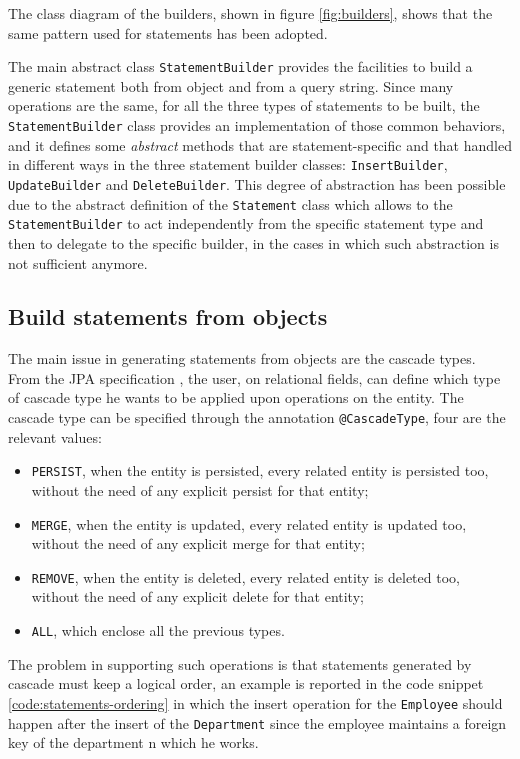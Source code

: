 \noindent The class diagram of the builders, shown in figure \ref{fig:builders}, shows that the same pattern used for statements has been adopted.

\noindent The main abstract class \texttt{StatementBuilder} provides the facilities to build a generic statement both from object and from a query string.
Since many operations are the same, for all the three types of statements to be built, the \texttt{StatementBuilder} class provides an implementation of those common behaviors, and it defines some \textit{abstract} methods that are statement-specific and that handled in different ways in the three statement builder classes: \texttt{InsertBuilder}, \texttt{UpdateBuilder} and \texttt{DeleteBuilder}.
This degree of abstraction has been possible due to the abstract definition of the \texttt{Statement} class which allows to the \texttt{StatementBuilder} to act independently from the specific statement type and then to delegate to the specific builder, in the cases in which such abstraction is not sufficient anymore.

\subsection{Build statements from objects}
The main issue in generating statements from objects are the cascade types. From the JPA specification \cite{book:projpa2}, the user, on relational fields, can define which type of cascade type he wants to be applied upon operations on the entity. The cascade type can be specified through the annotation \texttt{@CascadeType}, four are the relevant values:
\begin{itemize}
\item \texttt{PERSIST}, when the entity is persisted, every related entity is persisted too, without the need of any explicit persist for that entity;
\item \texttt{MERGE}, when the entity is updated, every related entity is updated too, without the need of any explicit merge for that entity;
\item \texttt{REMOVE}, when the entity is deleted, every related entity is deleted too, without the need of any explicit delete for that entity;
\item \texttt{ALL}, which enclose all the previous types.
\end{itemize}

\noindent The problem in supporting such operations is that statements generated by cascade must keep a logical order, an example is reported in the code snippet \ref{code:statements-ordering} in which the insert operation for the \texttt{Employee} should happen after the insert of the \texttt{Department} since the employee maintains a foreign key of the department n which he works.

